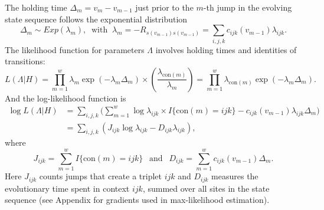 \documentclass[11pt]{article}
\newcommand{\context}[1]{\ensuremath{\mathrm{con}(#1)}}
\begin{document}
The holding time $\Delta_m = v_{m} - v_{m-1}$ just prior to the $m$-th
jump in the evolving state sequence follows the exponential
distribution
\[
\Delta_m \sim \mathit{Exp}(\lambda_m), ~\text{ with }~
\lambda_{m} = -R_{s(v_{m-1})s(v_{m-1})} = \sum_{i,j,k}c_{ijk}(v_{m-1})\lambda_{ijk}.
\]
The likelihood function for parameters $\Lambda$ involves holding times and
identities of transitions:
\begin{equation}\label{eqn:lik}
  L(\Lambda | H) = \prod_{m=1}^{w} \lambda_{m} \exp(-\lambda_{m}\Delta_m) \times {\textstyle\left(\frac{\lambda_{\context{m}}}{\lambda_m}\right)}
  =\prod_{m=1}^{w}\lambda_{\context{m}}\exp(-\lambda_m\Delta_m).
\end{equation}
And the log-likelihood function is
\begin{equation}\label{eqn:loglik}
  \begin{array}{ll}
    \log L(\Lambda | H) & = \sum_{i,j,k} \Big(\sum_{m=1}^w\log\lambda_{ijk}\times I{\{\context{m} = ijk\}} - c_{ijk}(v_{m-1})\lambda_{ijk}\Delta_m\Big)\\[1em]
    & = \sum_{i,j,k} \left(J_{ijk}\log\lambda_{ijk} - D_{ijk}\lambda_{ijk} \right),
  \end{array}
\end{equation}
where
\begin{equation}\label{def:JD}
J_{ijk} = \sum_{m=1}^w I\{\context{m} = ijk\}
~~\mbox{ and }~~
D_{ijk} = \sum_{m=1}^w c_{ijk}(v_{m-1})\Delta_m.
\end{equation}
Here $J_{ijk}$ counts jumps that create a triplet $ijk$ and $D_{ijk}$
measures the evolutionary time spent in context $ijk$, summed over all
sites in the state sequence (see Appendix for gradients used in
max-likelihood estimation).

\end{document}

